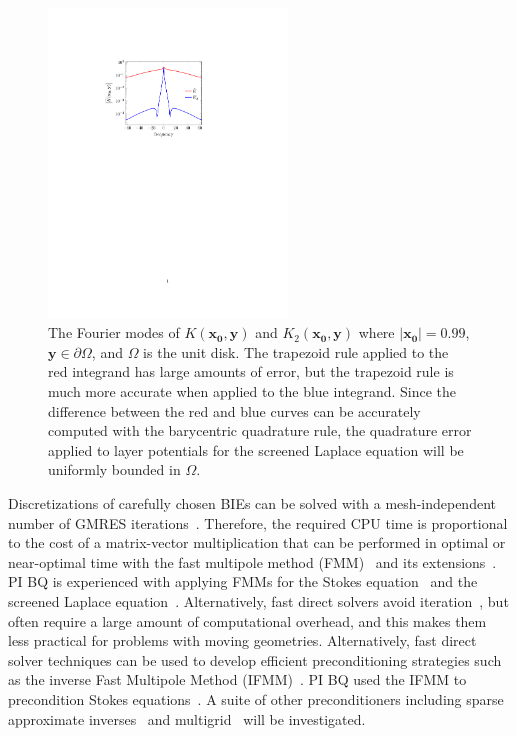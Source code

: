 %
\begin{figure}
\vspace*{-13pt}
\centerline{\includegraphics[width=2.5in]{figures/integrands}}
\vspace*{-13pt}
  \caption{{\footnotesize The Fourier modes of
  $K(\mathbf{x_0},\mathbf{y})$ and $K_2(\mathbf{x_0},\mathbf{y})$ where
  $|\mathbf{x_0}| = 0.99$, $\mathbf{y} \in \partial\Omega$, and
  $\Omega$ is the unit disk. The trapezoid rule applied to the red
  integrand has large amounts of error, but the trapezoid rule is much
  more accurate when applied to the blue integrand. Since the difference
  between the red and blue curves can be accurately computed with the
  barycentric quadrature rule, the quadrature error applied to layer
  potentials for the screened Laplace equation will be uniformly bounded
  in $\Omega$.}}
\label{fig:integrands}
\end{figure}
Discretizations of carefully chosen BIEs can be solved with a
mesh-independent number of GMRES
iterations~\cite{cam-ips-kel-mey-xue1996}. Therefore, the required CPU
time is proportional to the cost of a matrix-vector multiplication that
can be performed in optimal or near-optimal time with the fast multipole
method (FMM)~\cite{fmm5} and its extensions~\cite{fmm1, fmm2, fmm3,
fmm4, fmm6, fmm7, fmm8}. PI BQ is experienced with applying FMMs for the
Stokes equation~\cite{qua-bir2014, bys-sha-qua2020} and the screened
Laplace equation~\cite{kro-qua2011, qua2011}.  Alternatively, fast
direct solvers avoid iteration~\cite{fds2, fds3, fds4, fds5, fds6, fds7,
ho2016cpam1, minden2016, minden2017siammms}, but often require a large
amount of computational overhead, and this makes them less practical for
problems with moving geometries. Alternatively, fast direct solver
techniques can be used to develop efficient preconditioning strategies
such as the inverse Fast Multipole Method (IFMM)~\cite{cou-pou-dar2017}.
PI BQ used the IFMM to precondition Stokes
equations~\cite{qua-cou-dar2018}. A suite of other preconditioners
including sparse approximate inverses~\cite{che2000} and
multigrid~\cite{hem-sch1981, sch1982} will be investigated.

